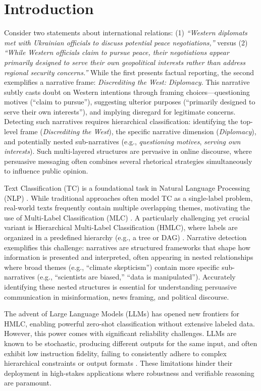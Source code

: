 \section{Introduction}

Consider two statements about international relations: (1) \textit{``Western diplomats met with Ukrainian officials to discuss potential peace negotiations,''} versus (2) \textit{``While Western officials claim to pursue peace, their negotiations appear primarily designed to serve their own geopolitical interests rather than address regional security concerns.''} While the first presents factual reporting, the second exemplifies a narrative frame: \textit{Discrediting the West: Diplomacy}. This narrative subtly casts doubt on Western intentions through framing choices—questioning motives (``claim to pursue''), suggesting ulterior purposes (``primarily designed to serve their own interests''), and implying disregard for legitimate concerns. Detecting such narratives requires hierarchical classification: identifying the top-level frame (\textit{Discrediting the West}), the specific narrative dimension (\textit{Diplomacy}), and potentially nested sub-narratives (e.g., \textit{questioning motives}, \textit{serving own interests}). Such multi-layered structures are pervasive in online discourse, where persuasive messaging often combines several rhetorical strategies simultaneously to influence public opinion.

Text Classification (TC) is a foundational task in Natural Language Processing (NLP) \citep{Zangari2024}. While traditional approaches often model TC as a single-label problem, real-world texts frequently contain multiple overlapping themes, motivating the use of Multi-Label Classification (MLC) \citep{Hu2025,TidakeSane2018}. A particularly challenging yet crucial variant is Hierarchical Multi-Label Classification (HMLC), where labels are organized in a predefined hierarchy (e.g., a tree or DAG) \citep{liu2023recentadvanceshierarchicalmultilabel}. Narrative detection exemplifies this challenge: narratives are structured frameworks that shape how information is presented and interpreted, often appearing in nested relationships where broad themes (e.g., ``climate skepticism'') contain more specific sub-narratives (e.g., ``scientists are biased,'' ``data is manipulated''). Accurately identifying these nested structures is essential for understanding persuasive communication in misinformation, news framing, and political discourse.

The advent of Large Language Models (LLMs) has opened new frontiers for HMLC, enabling powerful zero-shot classification without extensive labeled data. However, this power comes with significant reliability challenges. LLMs are known to be stochastic, producing different outputs for the same input, and often exhibit low instruction fidelity, failing to consistently adhere to complex hierarchical constraints or output formats \citep{Qin2024InFoBench}. These limitations hinder their deployment in high-stakes applications where robustness and verifiable reasoning are paramount.

